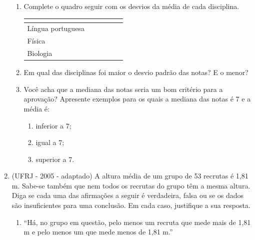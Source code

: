 \begin{enumerate}
\begin{enumerate}
\item {} 
Complete o quadro seguir com os desvios da média de cada disciplina.

\begin{table}[H]
\centering
{}
\begin{tabu} to .7\textwidth{|l|c|c|c|c|c|}
\hline
{} &  &  \\
\hline
Língua portuguesa & \phantom{Soma} & \phantom{Soma} & \phantom{Soma} & \phantom{Soma} & \\
\hline
Física & & & & & \\
\hline
Biologia & & & & & \\
\hline
\end{tabu}
\end{table}


\item {} 
Em qual das disciplinas foi maior o desvio padrão das notas? E o menor?

\item {} 
Você acha que a mediana das notas seria um bom critério para a aprovação? Apresente exemplos para os quais a mediana das notas é 7 e a média é:
\begin{enumerate}[label=\roman*)]
\item {} 
inferior a 7;

\item {} 
igual a 7;

\item {} 
superior a 7.

\end{enumerate}

\end{enumerate}

\item (UFRJ - 2005 - adaptado)  A altura média de um grupo de 53 recrutas é 1,81 m. Sabe-se também que nem todos os recrutas do grupo têm a mesma altura. Diga se cada uma das afirmações a seguir é verdadeira, falsa ou se os dados são insuficientes para uma conclusão. Em cada caso, justifique a sua resposta.
\begin{enumerate}
\item {} 
“Há, no grupo em questão, pelo menos um recruta que mede mais de 1,81 m e pelo menos um que mede menos de 1,81 m.”


\end{enumerate}
\end{enumerate}
